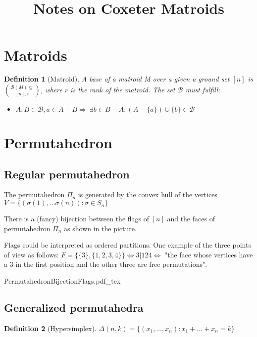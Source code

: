 \documentclass{myclass}
\title{Notes on Coxeter Matroids}
\newtheorem*{definition}{Definition}
\newcommand{\incfig}[1]{%
\center
\def\svgwidth{0.9\columnwidth}
{#1.pdf_tex}
}
\begin{document}
\maketitle
\tableofcontents
\newpage

\section{Matroids}
\begin{definition}[Matroid]
A base of a matroid M over a given a ground set $[n]$ is $\mathcal{B}(M)\subseteq \choose{[n], r}$, where $r$ is the rank of the matroid. The set  $\mathcal{B}$ must fulfill:
\begin{itemize}[topsep=-6pt, itemsep=0pt]
  \item $A, B \in \mathcal{B}, a\in A-B \Rightarrow \ \exists b\in B-A : (A-\{a\})\cup \{b\}\in \mathcal{B}$
\end{itemize}
\end{definition}

\section{Permutahedron}
\subsection{Regular permutahedron}
The permutahedron $\Pi_n$ is generated by the convex hull of the vertices $V = \{(\sigma(1), \ldots \sigma (n)) : \sigma \in S_n \}$

There is a (fancy) bijection between the flags of $[n]$ and the faces of permutahedron $\Pi_n$ as shown in the picture.

Flags could be interpreted as ordered partitions. One example of the three points of view as follows: $F = \{\{3\}, \{1, 2, 3, 4\}\} \iff 3|124 \iff$ "the face whose vertices have a $3$ in the first position and the other three are free permutations".

\begin{minipage}{\textwidth}
\incfig{PermutahedronBijectionFlags}
\end{minipage}

\subsection{Generalized permutahedra}

\begin{definition}[Hypersimplex] 
  $\Delta(n, k)=\{(x_1, \ldots, x_n): x_1 + \ldots+ x_n = k\}$
\end{definition}
\end{document}
